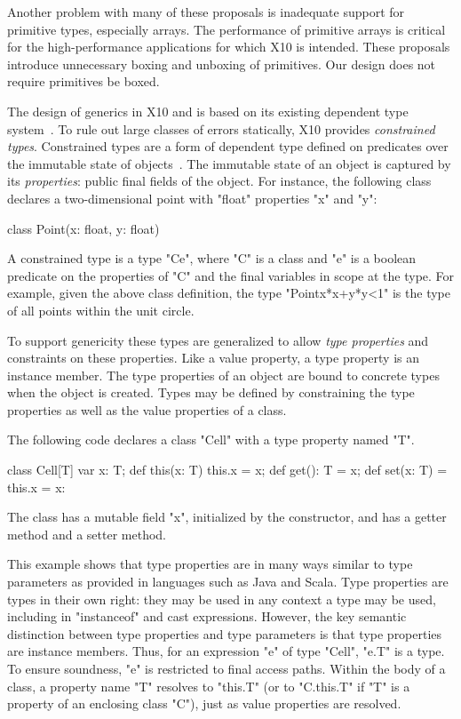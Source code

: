 \documentclass{llncs}
\begin{document}
Another problem with many of these proposals is inadequate support
for primitive types, especially arrays. The performance of primitive arrays is
critical for the high-performance applications for which
X10 is intended. These proposals introduce unnecessary boxing
and unboxing of primitives.
Our design 
does not require primitives be boxed.

The design of generics in X10 and is based on its existing
dependent type system~\cite{X10,constrained-types}.
To rule out large classes of errors statically, 
X10 provides \emph{constrained types}.
Constrained types are a form of dependent type
defined on predicates over the immutable state of
objects~\cite{X10,constrained-types}.
%
The immutable state of an object is captured by its
\emph{properties}: public final fields of the object. 
For instance, the following class declares a two-dimensional
point with \xcd"float" properties \xcd"x" and \xcd"y":
\begin{xten}
class Point(x: float, y: float) { }
\end{xten}
A constrained type is a type \xcd"C{e}", where \xcd"C" is a
class and \xcd"e" is a boolean predicate on the properties of
\xcd"C" and the final variables in scope at the type.
For example, given the above class definition,
the type \xcd"Point{x*x+y*y<1}" is the type of all
points within the unit circle.

To support genericity these types are generalized
to allow \emph{type properties} and constraints on these properties.
Like a value property, a type property is an instance member.
The type properties of an object are bound to concrete types
when the object is
created.
Types may be defined by constraining the type properties as
well as the value properties of a class.

The following code declares a class \xcd"Cell" with a type
property named \xcd"T".
\begin{xten}
class Cell[T] {
    var x: T;
    def this(x: T) { this.x = x; }
    def get(): T = x;
    def set(x: T) = { this.x = x: }
}
\end{xten}
The class has a mutable field \xcd"x", initialized by the
constructor,
and has a getter method and a setter method.

This example shows that type properties are in many ways similar to
type parameters as provided in languages such as Java and Scala.
Type properties are types in their own right:
they may be used in any context a type may be used,
including in \xcd"instanceof" and cast expressions.
However, the key semantic distinction between type properties
and type parameters is that type properties are instance
members.
Thus, for an expression \xcd"e" of type \xcd"Cell", \xcd"e.T" is a type. 
To ensure
soundness, \xcd"e" is restricted to final access paths.
Within the body of a class, a property name \xcd"T" resolves
to \xcd"this.T" (or to \xcd"C.this.T" if \xcd"T" is a property of
an enclosing class \xcd"C"), just as value properties are
resolved.
\end{document}
